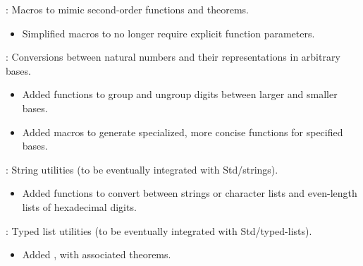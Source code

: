 
\begin{frame}

\implibtitle

:
Macros to mimic second-order functions and theorems.
\begin{itemize}
\item
Simplified macros to no longer require explicit function parameters.
\end{itemize}

\end{frame}


\begin{frame}

\implibtitle

:
Conversions between natural numbers
and their representations in arbitrary bases.
\begin{itemize}
\item
Added functions to group and ungroup digits between larger and smaller bases.
\item
Added macros to generate specialized, more concise functions
for specified bases.
\end{itemize}

\separation

:
String utilities (to be eventually integrated with Std/strings).
\begin{itemize}
\item
Added functions to convert between strings or character lists
and even-length lists of hexadecimal digits.
\end{itemize}

\separation

:
Typed list utilities (to be eventually integrated with Std/typed-lists).
\begin{itemize}
\item
Added , with associated theorems.
\end{itemize}

\end{frame}


